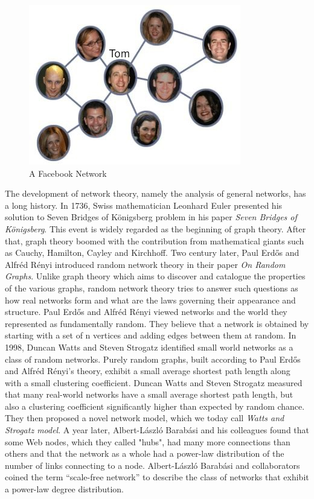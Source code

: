 \begin{figure}[ht!]
\includegraphics [totalheight=0.23\textheight]{images/facebook.jpg}
\caption {A Facebook Network}
\label {F:facebook}
\end{figure}

The development of network theory, namely the analysis of general networks, has a long history. In 1736, Swiss mathematician Leonhard Euler 	presented his solution to Seven Bridges of K\"{o}nigsberg problem in his paper {\em Seven Bridges of K\"{o}nigsberg}\cite{www-graph}. This event is widely regarded as the beginning of graph theory. After that, graph theory boomed with the contribution from mathematical giants such as Cauchy, Hamilton, Cayley and Kirchhoff. Two century later, Paul Erd\H{o}s and Alfr\'{e}d R\'{e}nyi introduced random network theory in their paper {\em On Random Graphs}\cite{www-random}. Unlike graph theory which aims to discover and catalogue the properties of the various graphs, random network theory tries to answer such questions as how real networks form and what are the laws governing their appearance and structure. Paul Erd\H{o}s and Alfr\'{e}d R\'{e}nyi viewed networks and the world they represented as fundamentally random.  They believe that a network is obtained by starting with a set of n vertices and adding edges between them at random. In 1998, Duncan Watts and Steven Strogatz identified small world networks as a class of random networks\cite{www-small}. Purely random graphs, built according to  Paul Erd\H{o}s and Alfr\'{e}d R\'{e}nyi's theory, exhibit a small average shortest path length along with a small clustering coefficient. Duncan Watts and Steven Strogatz measured that many real-world networks have a small average shortest path length, but also a clustering coefficient significantly higher than expected by random chance. They then proposed a novel network model, which we today call {\em Watts and Strogatz model}. A year later, Albert-L\'{a}szl\'{o} Barab\'{a}si and his colleagues found that some Web nodes, which they called "hubs", had many more connections than others and that the network as a whole had a power-law distribution of the number of links connecting to a node\cite{www-scale}. Albert-L\'{a}szl\'{o} Barab\'{a}si and collaborators coined the term ``scale-free network'' to describe the class of networks that exhibit a power-law degree distribution. 


